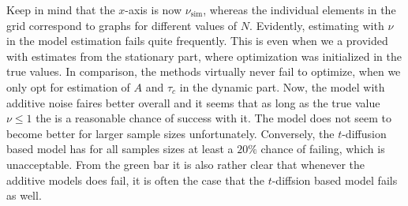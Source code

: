 Keep in mind that the $x$-axis is now $\nu_{\mathrm{sim}}$, whereas the individual elements in the grid correspond to graphs for different values of $N$. Evidently, estimating with $\nu$ in the model estimation fails quite frequently. This is even when we a provided with estimates from the stationary part, where optimization was initialized in the true values. In comparison, the methods virtually never fail to optimize, when we only opt for estimation of $A$ and $\tau_c$ in the dynamic part. Now, the model with additive noise faires better overall and it seems that as long as the true value $\nu\leq 1$ the is a reasonable chance of success with it. The model does not seem to become better for larger sample sizes unfortunately. Conversely, the $t$-diffusion based model has for all samples sizes at least a $20\%$ chance of failing, which is unacceptable. From the green bar it is also rather clear that whenever the additive models does fail, it is often the case that the $t$-diffsion based model fails as well.  
